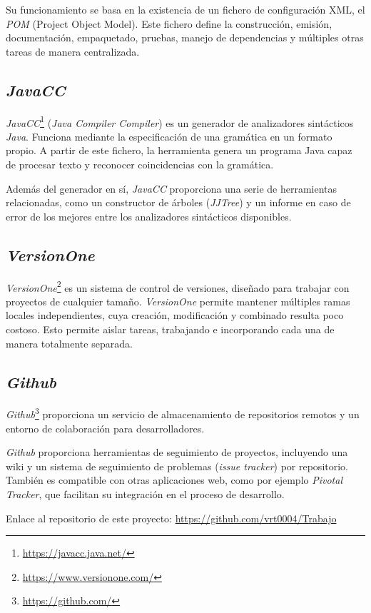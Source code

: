 Su funcionamiento se basa en la existencia de un fichero de configuración XML, el \textit{POM} (Project Object Model).
Este fichero define la construcción, emisión, documentación, empaquetado, pruebas, manejo de dependencias y múltiples otras tareas de manera centralizada.

\subsection{\textit{JavaCC}}
\textit{JavaCC}\footnote{\url{https://javacc.java.net/}} (\emph{Java Compiler Compiler}) es un generador de analizadores sintácticos \textit{Java}.
Funciona mediante la especificación de una gramática en un formato propio.
A partir de este fichero, la herramienta genera un programa Java capaz de procesar texto y reconocer coincidencias con la gramática.

Además del generador en sí, \textit{JavaCC} proporciona una serie de herramientas relacionadas, como un constructor de árboles (\textit{JJTree}) y un informe en caso de error de los mejores entre los analizadores sintácticos disponibles.

\subsection{\textit{VersionOne}}
\textit{VersionOne}\footnote{\url{https://www.versionone.com/}} es un sistema de control de versiones, diseñado para trabajar con proyectos de cualquier tamaño.
\textit{VersionOne} permite mantener múltiples ramas locales independientes, cuya creación, modificación y combinado resulta poco costoso.
Esto permite aislar tareas, trabajando e incorporando cada una de manera totalmente separada.

\subsection{\textit{Github}}
\textit{Github}\footnote{\url{https://github.com/}} proporciona un servicio de almacenamiento de repositorios remotos y un entorno de colaboración para desarrolladores.

\textit{Github} proporciona herramientas de seguimiento de proyectos, incluyendo una wiki y un sistema de seguimiento de problemas (\emph{issue tracker}) por repositorio.
También es compatible con otras aplicaciones web, como por ejemplo \textit{Pivotal Tracker}, que facilitan su integración en el proceso de desarrollo.

Enlace al repositorio de este proyecto:  \url{https://github.com/vrt0004/Trabajo}

